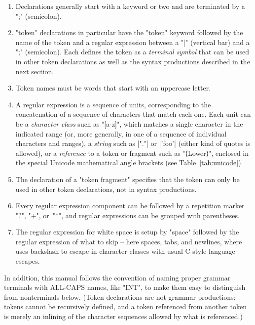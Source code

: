 \documentclass[11pt]{article} %
\begin{document}
\begin{notation}\leavevmode
  \begin{enumerate}

  \item Declarations generally start with a keyword or two and are terminated by a ";" (semicolon).

  \item "token" declarations in particular have the "token" keyword followed by the name of the
    token and a regular expression between a "|" (vertical bar) and a ";" (semicolon). Each defines
    the token as a \emph{terminal symbol} that can be used in other token declarations as well as
    the syntax productions described in the next section.

  \item Token names must be words that start with an uppercase letter.

  \item A regular expression is a sequence of units, corresponding to the concatenation of a
    sequence of characters that match each one.  Each unit can be a \emph{character class} such as
    "[a-z]", which matches a single character in the indicated range (or, more generally, in one of
    a sequence of individual characters and ranges), a \emph{string} such as \hacsc|"."| or
    \hacsc|'foo'| (either kind of quotes is allowed), or a \emph{reference} to a token or fragment
    such as "⟨Lower⟩", enclosed in the special Unicode mathematical angle brackets (see
    Table~\ref{tab:unicode}).

  \item The declaration of a "token fragment" specifies that the token can only be used in other
    token declarations, not in syntax productions.

  \item Every regular expression component can be followed by a repetition marker "?", "+", or~"*",
    and regular expressions can be grouped with parentheses.

  \item The regular expression for white space is setup by "space" followed by the regular
    expression of what to skip -- here spaces, tabs, and newlines, where \HAX uses backslash to
    escape in character classes with usual C-style language escapes.

  \end{enumerate}
  In addition, this manual follows the convention of naming proper grammar terminals with ALL-CAPS
  names, like "INT", to make them easy to distinguish from nonterminals below. (Token declarations
  are not grammar productions: tokens cannot be recursively defined, and a token referenced from
  another token is merely an inlining of the character sequences allowed by what is referenced.)
\end{notation}
\end{document}
